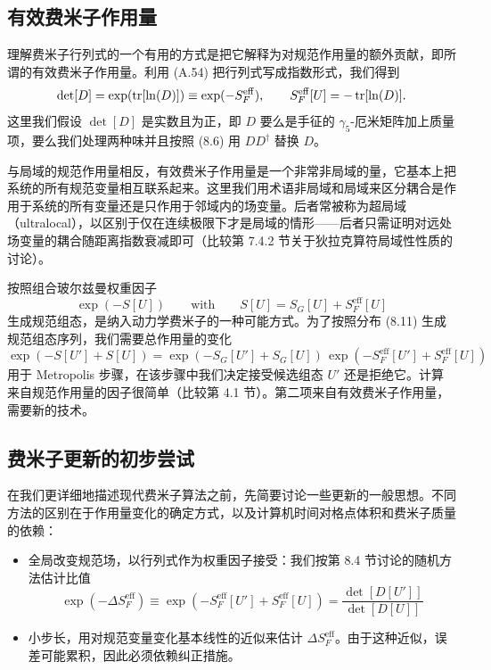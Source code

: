 \subsection{有效费米子作用量}

理解费米子行列式的一个有用的方式是把它解释为对规范作用量的额外贡献，即所谓的有效费米子作用量。利用 (A.54) 把行列式写成指数形式，我们得到
\begin{equation}
\det[D] = \exp(\operatorname{tr}[\ln(D)]) \equiv \exp(-S_F^{\mathrm{eff}}), \qquad
S_F^{\mathrm{eff}}[U] = -\operatorname{tr}[\ln(D)].
\end{equation}
这里我们假设 $\det[D]$ 是实数且为正，即 $D$ 要么是手征的 $\gamma_5$-厄米矩阵加上质量项，要么我们处理两种味并且按照 (8.6) 用 $DD^\dagger$ 替换 $D$。

与局域的规范作用量相反，有效费米子作用量是一个非常非局域的量，它基本上把系统的所有规范变量相互联系起来。这里我们用术语非局域和局域来区分耦合是作用于系统的所有变量还是只作用于邻域内的场变量。后者常被称为超局域（ultralocal），以区别于仅在连续极限下才是局域的情形——后者只需证明对远处场变量的耦合随距离指数衰减即可（比较第 7.4.2 节关于狄拉克算符局域性性质的讨论）。

按照组合玻尔兹曼权重因子
\begin{equation}
\exp(-S[U]) \qquad \text{with} \qquad S[U] = S_G[U] + S_F^{\mathrm{eff}}[U]
\end{equation}
生成规范组态，是纳入动力学费米子的一种可能方式。为了按照分布 (8.11) 生成规范组态序列，我们需要总作用量的变化
\begin{equation}
\exp(-S[U'] + S[U]) = \exp(-S_G[U'] + S_G[U])\,
  \exp(-S_F^{\mathrm{eff}}[U'] + S_F^{\mathrm{eff}}[U])
\end{equation}
用于 Metropolis 步骤，在该步骤中我们决定接受候选组态 $U'$ 还是拒绝它。计算来自规范作用量的因子很简单（比较第 4.1 节）。第二项来自有效费米子作用量，需要新的技术。

\subsection{费米子更新的初步尝试}

在我们更详细地描述现代费米子算法之前，先简要讨论一些更新的一般思想。不同方法的区别在于作用量变化的确定方式，以及计算机时间对格点体积和费米子质量的依赖：
\begin{itemize}
  \item 全局改变规范场，以行列式作为权重因子接受：我们按第 8.4 节讨论的随机方法估计比值
        \begin{equation}
        \exp(-\Delta S_F^{\mathrm{eff}})
        \equiv \exp(-S_F^{\mathrm{eff}}[U'] + S_F^{\mathrm{eff}}[U])
        = \frac{\det[D[U']]}{\det[D[U]]}
        \end{equation}
  \item 小步长，用对规范变量变化基本线性的近似来估计 $\Delta S_F^{\mathrm{eff}}$。由于这种近似，误差可能累积，因此必须依赖纠正措施。
\end{itemize}

